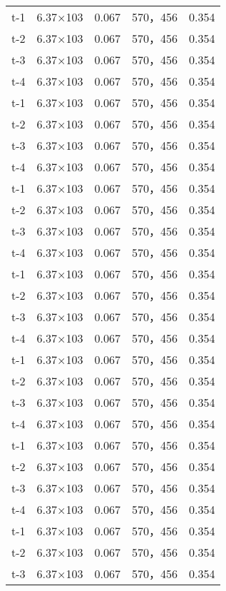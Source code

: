 \documentclass[../../main.tex]{subfiles}
\begin{document}
\begin{longtable}{ccccc}
t-1     &6.37×103       &0.067  &570，456        &0.354\\
t-2     &6.37×103       &0.067  &570，456        &0.354\\
t-3     &6.37×103       &0.067  &570，456        &0.354\\
t-4     &6.37×103       &0.067  &570，456        &0.354\\
t-1     &6.37×103       &0.067  &570，456        &0.354\\
t-2     &6.37×103       &0.067  &570，456        &0.354\\
t-3     &6.37×103       &0.067  &570，456        &0.354\\
t-4     &6.37×103       &0.067  &570，456        &0.354\\
t-1     &6.37×103       &0.067  &570，456        &0.354\\
t-2     &6.37×103       &0.067  &570，456        &0.354\\
t-3     &6.37×103       &0.067  &570，456        &0.354\\
t-4     &6.37×103       &0.067  &570，456        &0.354\\
t-1     &6.37×103       &0.067  &570，456        &0.354\\
t-2     &6.37×103       &0.067  &570，456        &0.354\\
t-3     &6.37×103       &0.067  &570，456        &0.354\\
t-4     &6.37×103       &0.067  &570，456        &0.354\\
t-1     &6.37×103       &0.067  &570，456        &0.354\\
t-2     &6.37×103       &0.067  &570，456        &0.354\\
t-3     &6.37×103       &0.067  &570，456        &0.354\\
t-4     &6.37×103       &0.067  &570，456        &0.354\\
t-1     &6.37×103       &0.067  &570，456        &0.354\\
t-2     &6.37×103       &0.067  &570，456        &0.354\\
t-3     &6.37×103       &0.067  &570，456        &0.354\\
t-4     &6.37×103       &0.067  &570，456        &0.354\\
t-1     &6.37×103       &0.067  &570，456        &0.354\\
t-2     &6.37×103       &0.067  &570，456        &0.354\\
t-3     &6.37×103       &0.067  &570，456        &0.354\\

\end{longtable}
\end{document}
